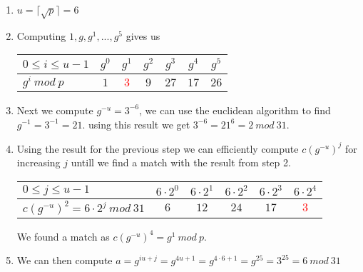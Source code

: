 \begin{enumerate}
\item $u = \lceil \sqrt{p} \rceil = 6$
\item Computing $1,g,g^1,...,g^5$ gives us  \\

\begin{tabular}{|l|c|c|c|c|c|c|}
    \hline  
    $0 \leq i \leq u-1$             &   $g^0$   &   $g^1$     &   $g^2$     &   $g^3$     &   $g^4$     &   $g^5$     \\
    \hline  
    $g^i \ mod \ p$ &   $1$       &   \textcolor{red}{$3$}       &   $9$       &   $27$      &   $17$      &   $26$      \\
    \hline 
\end{tabular}

\item Next we compute $g^{-u} = 3^{-6}$, we can use the euclidean algorithm to find $g^{-1} = 3^{-1} = 21$. using this result we get $3^{-6} = 21^6 = 2 \ mod \ 31$. 

\item Using the result for the previous step we can efficiently compute $c(g^{-u})^j$ for increasing $j$ untill we find a match with the result from step 2. \\

\iffalse
\begin{align*}
    c(g^{-u})^0 &= 6 \cdot 2^0 = 6 \\
    c(g^{-u})^1 &= 6 \cdot 2^1 = 12 \\
    c(g^{-u})^2 &= 6 \cdot 2^2 = 24 \\
    c(g^{-u})^3 &= 6 \cdot 2^3 = 17 \ mod \ 31 \\
    c(g^{-u})^4 &= 6 \cdot 2^4 = 3 \ mod \ 13
\end{align*}
\fi 

\begin{tabular}{|l|c|c|c|c|c|}
    \hline  
    $0 \leq j \leq u-1$    &   $6 \cdot 2^0$   &   $6 \cdot 2^1$     &   $6 \cdot 2^2$     &   $6 \cdot 2^3$     &   $6 \cdot 2^4$        \\
    \hline  
    $c(g^{-u})^2 = 6 \cdot 2^j \ mod \ 31$ &   $6$   &   $12$   &   $24$   &   $17$      &   \textcolor{red}{$3$}       \\
    \hline 
\end{tabular}

We found a match as $c(g^{-u})^4 = g^1 \ mod \ p$. 
\item We can then compute $a = g^{iu+j} = g^{4u+1} = g^{4 \cdot 6 + 1} = g^{25} = 3^{25} = 6 \ mod \ 31$

\end{enumerate}



